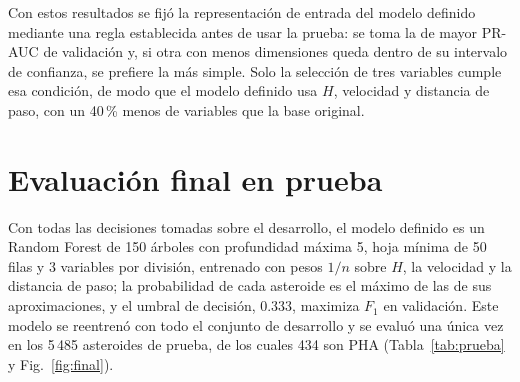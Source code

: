 \documentclass[conference]{IEEEtran}
\begin{document}
Con estos resultados se fijó la representación de entrada del modelo definido mediante una regla establecida antes de usar la prueba: se toma la de mayor PR-AUC de validación y, si otra con menos dimensiones queda dentro de su intervalo de confianza, se prefiere la más simple. Solo la selección de tres variables cumple esa condición, de modo que el modelo definido usa $H$, velocidad y distancia de paso, con un 40\,\% menos de variables que la base original.

\section{Evaluación final en prueba}
\label{sec:prueba}

Con todas las decisiones tomadas sobre el desarrollo, el modelo definido es un Random Forest de 150 árboles con profundidad máxima 5, hoja mínima de 50 filas y 3 variables por división, entrenado con pesos $1/n$ sobre $H$, la velocidad y la distancia de paso; la probabilidad de cada asteroide es el máximo de las de sus aproximaciones, y el umbral de decisión, 0.333, maximiza $F_1$ en validación. Este modelo se reentrenó con todo el conjunto de desarrollo y se evaluó una única vez en los 5\,485 asteroides de prueba, de los cuales 434 son PHA (Tabla~\ref{tab:prueba} y Fig.~\ref{fig:final}).

\begin{table}[t]
\centering
\caption{Evaluación final en prueba, por asteroide, con IC 95\,\% por \emph{bootstrap} de asteroides. El Random Forest definido es el único modelo evaluado en prueba; las dos referencias se ajustaron con el desarrollo. Exactitud del clasificador trivial (todo no PHA): 0.921.}
\label{tab:prueba}
\footnotesize
\setlength{\tabcolsep}{3pt}
\end{table}
\end{document}
